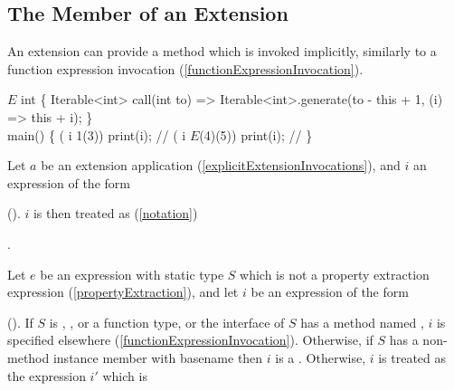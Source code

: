 \documentclass[makeidx]{article}
\begin{document}
\subsection{The \CALL{} Member of an Extension}

\LMHash{}%
An extension can provide a \CALL{} method which is invoked implicitly,
similarly to a function expression invocation
(\ref{functionExpressionInvocation}).


\begin{dartCode}
\EXTENSION{} $E$ \ON{} int \{
  Iterable<int> call(int to) =>
      Iterable<int>.generate(to - this + 1, (i) => this + i);
\}
\\
\VOID{} main() \{
  \FOR{} (\VAR{} i \IN{} 1(3)) print(i); // 
  \FOR{} (\VAR{} i \IN{} $E$(4)(5)) print(i); // 
\}
\end{dartCode}


\LMHash{}%
%
Let $a$ be an extension application
(\ref{explicitExtensionInvocations}),
and $i$ an expression of the form

\noindent
{}

\noindent
().
$i$ is then treated as
(\ref{notation})

\noindent
{}.


\LMHash{}%
%
Let $e$ be an expression with static type $S$
which is not a property extraction expression
(\ref{propertyExtraction}),
and let $i$ be an expression of the form

\noindent
{}

\noindent
().
If $S$ is \DYNAMIC, \FUNCTION, or a function type,
or the interface of $S$ has a method named \CALL,
$i$ is specified elsewhere
(\ref{functionExpressionInvocation}).
Otherwise, if $S$ has a non-method instance member with basename \CALL{}
then $i$ is a .
Otherwise, $i$ is treated as the expression $i'$ which is
\end{document}
